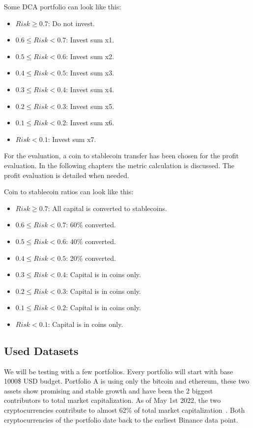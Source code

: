 Some DCA portfolio can look like this:
\begin{itemize}
    \item $Risk \ge  0.7$: Do not invest.
    \item $0.6 \le Risk < 0.7$: Invest sum x1.
    \item $0.5 \le Risk < 0.6$: Invest sum x2.
    \item $0.4 \le Risk < 0.5$: Invest sum x3.
    \item $0.3 \le Risk < 0.4$: Invest sum x4.
    \item $0.2 \le Risk < 0.3$: Invest sum x5.
    \item $0.1 \le Risk < 0.2$: Invest sum x6.
    \item $Risk < 0.1$: Invest sum x7.
\end{itemize}

For the evaluation, a coin to stablecoin transfer has been chosen for the profit evaluation. In the following chapters the metric calculation is discussed. The profit evaluation is detailed when needed.

Coin to stablecoin ratios can look like this:
\begin{itemize}
    \item $Risk \ge  0.7$: All capital is converted to stablecoins.
    \item $0.6 \le Risk < 0.7$: 60\% converted.
    \item $0.5 \le Risk < 0.6$: 40\% converted.
    \item $0.4 \le Risk < 0.5$: 20\% converted.
    \item $0.3 \le Risk < 0.4$: Capital is in coins only.
    \item $0.2 \le Risk < 0.3$: Capital is in coins only.
    \item $0.1 \le Risk < 0.2$: Capital is in coins only.
    \item $Risk < 0.1$: Capital is in coins only.
\end{itemize}


\subsection*{Used Datasets}
We will be testing with a few portfolios. Every portfolio will start with base 1000\$ USD budget. Portfolio A is using only the bitcoin and ethereum, these two assets show promising and stable growth and have been the 2 biggest contributors to total market capitalization. As of May 1st 2022, the two cryptocurrencies contribute to almost 62\% of total market capitalization~\cite{coinmarketcap:globalmetrics}. Both cryptocurrencies of the portfolio date back to the earliest Binance data point.

